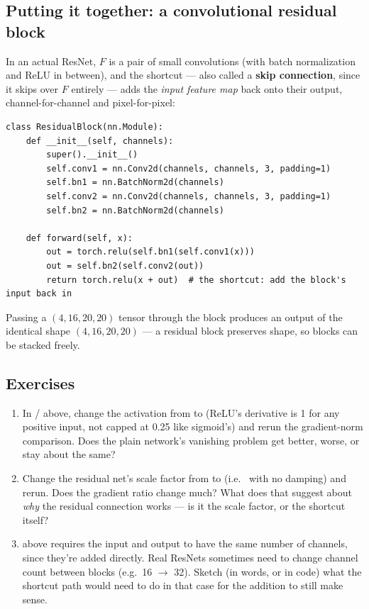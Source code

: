 \subsection*{Putting it together: a convolutional residual block}

In an actual ResNet, $F$ is a pair of small convolutions (with batch normalization and ReLU in between), and the shortcut --- also called a \textbf{skip connection}, since it skips over $F$ entirely --- adds the \emph{input feature map} back onto their output, channel-for-channel and pixel-for-pixel:

\begin{lstlisting}
class ResidualBlock(nn.Module):
    def __init__(self, channels):
        super().__init__()
        self.conv1 = nn.Conv2d(channels, channels, 3, padding=1)
        self.bn1 = nn.BatchNorm2d(channels)
        self.conv2 = nn.Conv2d(channels, channels, 3, padding=1)
        self.bn2 = nn.BatchNorm2d(channels)

    def forward(self, x):
        out = torch.relu(self.bn1(self.conv1(x)))
        out = self.bn2(self.conv2(out))
        return torch.relu(x + out)  # the shortcut: add the block's input back in
\end{lstlisting}

Passing a $(4,16,20,20)$ tensor through the block produces an output of the identical shape $(4,16,20,20)$ --- a residual block preserves shape, so blocks can be stacked freely.

\subsection*{Exercises}
\begin{enumerate}
  \item In / above, change the activation from  to  (ReLU's derivative is 1 for any positive input, not capped at 0.25 like sigmoid's) and rerun the gradient-norm comparison. Does the plain network's vanishing problem get better, worse, or stay about the same?
  \item Change the residual net's scale factor from  to  (i.e.\  with no damping) and rerun. Does the gradient ratio change much? What does that suggest about \emph{why} the residual connection works --- is it the scale factor, or the  shortcut itself?
  \item {} above requires the input and output to have the same number of channels, since they're added directly. Real ResNets sometimes need to change channel count between blocks (e.g.\ 16 $\to$ 32). Sketch (in words, or in code) what the shortcut path would need to do in that case for the addition to still make sense.
\end{enumerate}

\vfill
{}
